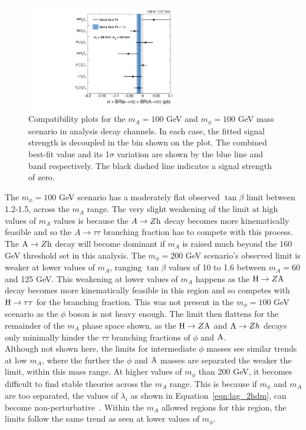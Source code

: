 \begin{figure}[!hbtp]
\centering
    \includegraphics[width=0.6\textwidth]{Figures/ChannelCompatibilityCheck_FitResults_mphi100mA100_channel.pdf}
\caption{Compatibility plots for the $m_{A}=100$ GeV and $m_{\phi}=100$ GeV mass scenario in analysis decay channels. In each case, the fitted signal strength is decoupled in the bin shown on the plot. The combined best-fit value and its 1$\sigma$ variation are shown by the blue line and band respectively. The black dashed line indicates a signal strength of zero.}
\label{fig:4tau_ccc}
\end{figure}

The $m_{\phi} = 100$ GeV scenario has a moderately flat observed $\tan\beta$ limit between 1.2-1.5, across the $m_{A}$ range.
The very slight weakening of the limit at high values of $m_{A}$ values is because the $A\rightarrow Z{\text{h}}$ decay becomes more kinematically feasible and so the $A\rightarrow\tau\tau$ branching fraction has to compete with this process.
The ${\text{A}}\rightarrow Z{\text{h}}$ decay will become dominant if $m_{A}$ is raised much beyond the 160 GeV threshold set in this analysis.
The $m_{\phi} = 200$ GeV scenario's observed limit is weaker at lower values of $m_{A}$, ranging $\tan\beta$ values of 10 to 1.6 between $m_{A} = 60$ and 125 GeV.
This weakening at lower values of $m_{A}$ happens as the ${\text{H}}\rightarrow Z{\text{A}}$ decay becomes more kinematically feasible in this region and so competes with ${\text{H}}\rightarrow\tau\tau$ for the branching fraction.
This was not present in the $m_{\phi}=100$ GeV scenario as the $\phi$ boson is not heavy enough.
The limit then flattens for the remainder of the $m_{A}$ phase space shown, as the ${\text{H}}\rightarrow Z{\text{A}}$ and ${\text{A}}\rightarrow Zh$ decays only minimally hinder the $\tau\tau$ branching fractions of $\phi$ and ${\text{A}}$. \\

Although not shown here, the limits for intermediate $\phi$ masses see similar trends at low $m_{A}$, where the further the $\phi$ and ${\text{A}}$ masses are separated the weaker the limit, within this mass range.
At higher values of $m_\phi$ than 200 GeV, it becomes difficult to find stable theories across the $m_{A}$ range. 
This is because if $m_\phi$ and $m_{A}$ are too separated, the values of $\lambda_i$ as shown in Equation~\ref{eqn:lag_2hdm}, can become non-perturbative~\cite{Jueid:2021avn}.
Within the $m_{A}$ allowed regions for this region, the limits follow the same trend as seen at lower values of $m_{\phi}$. \\


